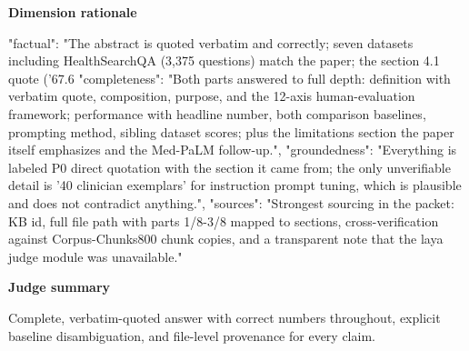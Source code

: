 \documentclass[10pt]{article}
\begin{document}
\textbf{Dimension rationale}
\begin{EvidenceText}
{
  "factual": "The abstract is quoted verbatim and correctly; seven datasets including HealthSearchQA (3,375 questions) match the paper; the section 4.1 quote ('67.6%
  "completeness": "Both parts answered to full depth: definition with verbatim quote, composition, purpose, and the 12-axis human-evaluation framework; performance with headline number, both comparison baselines, prompting method, sibling dataset scores; plus the limitations section the paper itself emphasizes and the Med-PaLM follow-up.",
  "groundedness": "Everything is labeled P0 direct quotation with the section it came from; the only unverifiable detail is '40 clinician exemplars' for instruction prompt tuning, which is plausible and does not contradict anything.",
  "sources": "Strongest sourcing in the packet: KB id, full file path with parts 1/8-3/8 mapped to sections, cross-verification against Corpus-Chunks800 chunk copies, and a transparent note that the laya judge module was unavailable."
}
\end{EvidenceText}

\textbf{Judge summary}
\begin{EvidenceText}
Complete, verbatim-quoted answer with correct numbers throughout, explicit baseline disambiguation, and file-level provenance for every claim.
\end{EvidenceText}
\end{document}
